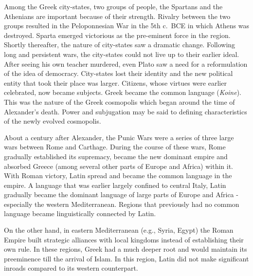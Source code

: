 Among the Greek city-states, two groups of people, the Spartans and the Athenians are important because of their strength. Rivalry between the two groups resulted in the Peloponnesian War in the 5th c.\ BCE in which Athens was destroyed. Sparta emerged victorious as the pre-eminent force in the region. Shortly thereafter, the nature of city-states saw a dramatic change. Following long and persistent wars, the city-states could not live up to their earlier ideal. After seeing his own teacher murdered, even Plato saw a need for a reformulation of the idea of democracy. City-states lost their identity and the new political entity that took their place was larger. Citizens, whose virtues were earlier celebrated, now became subjects. Greek became the common language ({\sl Koine}). This was the nature of the Greek cosmopolis which began around the time of Alexander’s death. Power and subjugation may be said to defining characteristics of the newly evolved cosmopolis.

About a century after Alexander, the Punic Wars were a series of three large wars between Rome and Carthage. During the course of these wars, Rome gradually established its supremacy, became the new dominant empire and absorbed Greece (among several other parts of Europe and Africa) within it. With Roman victory, Latin spread and became the common language in the empire. A language that was earlier largely confined to central Italy, Latin gradually became the dominant language of large parts of Europe and Africa - especially the western Mediterranean. Regions that previously had no common language became linguistically connected by Latin.

On the other hand, in eastern Mediterranean (e.g., Syria, Egypt) the Roman Empire built strategic alliances with local kingdoms instead of establishing their own rule. In these regions, Greek had a much deeper root and would maintain its preeminence till the arrival of Islam. In this region, Latin did not make significant inroads compared to its western counterpart.


